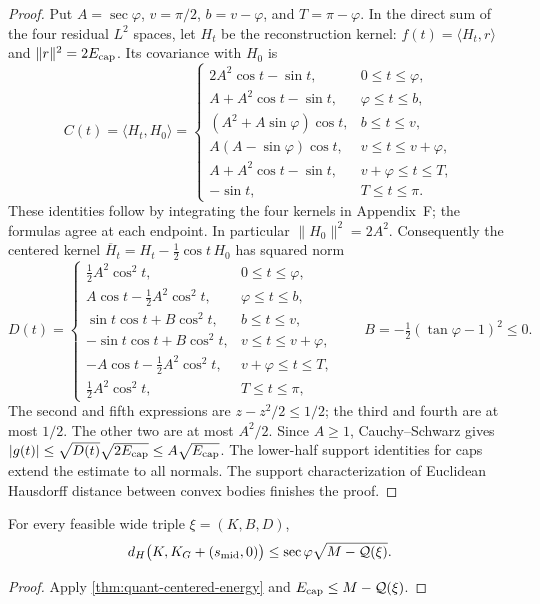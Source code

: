 \begin{proof}
Put $A=\sec\varphi$, $v=\pi/2$, $b=v-\varphi$, and $T=\pi-\varphi$.
In the direct sum of the four residual $L^2$ spaces, let $H_t$ be the
reconstruction kernel: $f(t)=\langle H_t,r\rangle$ and
$\|r\|^2=2E_{\rm cap}$. Its covariance with $H_0$ is
\[
 C(t)=\langle H_t,H_0\rangle=
 \begin{cases}
 2A^2\cos t-\sin t,&0\le t\le\varphi,\\
 A+A^2\cos t-\sin t,&\varphi\le t\le b,\\
 (A^2+A\sin\varphi)\cos t,&b\le t\le v,\\
 A(A-\sin\varphi)\cos t,&v\le t\le v+\varphi,\\
 A+A^2\cos t-\sin t,&v+\varphi\le t\le T,\\
 -\sin t,&T\le t\le\pi.
 \end{cases}
\]
These identities follow by integrating the four kernels in Appendix~F;
the formulas agree at each endpoint. In particular $\|H_0\|^2=2A^2$.
Consequently the centered kernel $\overline H_t=H_t-\frac12\cos t\,H_0$
has squared norm
\[
 D(t)=
 \begin{cases}
 \frac12A^2\cos^2t,&0\le t\le\varphi,\\
 A\cos t-\frac12A^2\cos^2t,&\varphi\le t\le b,\\
 \sin t\cos t+B\cos^2t,&b\le t\le v,\\
 -\sin t\cos t+B\cos^2t,&v\le t\le v+\varphi,\\
 -A\cos t-\frac12A^2\cos^2t,&v+\varphi\le t\le T,\\
 \frac12A^2\cos^2t,&T\le t\le\pi,
 \end{cases}
 \qquad B=-\tfrac12(\tan\varphi-1)^2\le0.
\]
The second and fifth expressions are $z-z^2/2\le1/2$; the third and
fourth are at most $1/2$. The other two are at most $A^2/2$.
Since $A\ge1$, Cauchy--Schwarz gives
$|g(t)|\le\sqrt{D(t)}\sqrt{2E_{\rm cap}}\le A\sqrt{E_{\rm cap}}$.
The lower-half support identities for caps extend the estimate to all
normals. The support characterization of Euclidean Hausdorff distance
between convex bodies finishes the proof.
\end{proof}

\begin{corollary}
\label{thm:quant-centered-cap}
For every feasible wide triple $\xi=(K,B,D)$,
\[
 d_H\bigl(K,K_G+(s_{\rm mid},0)\bigr)
 \le\sec\varphi\sqrt{M-\mathcal{Q}(\xi)}.
\]
\end{corollary}
\begin{proof}
Apply \cref{thm:quant-centered-energy} and $E_{\rm cap}\le M-\mathcal{Q}(\xi)$.
\end{proof}

